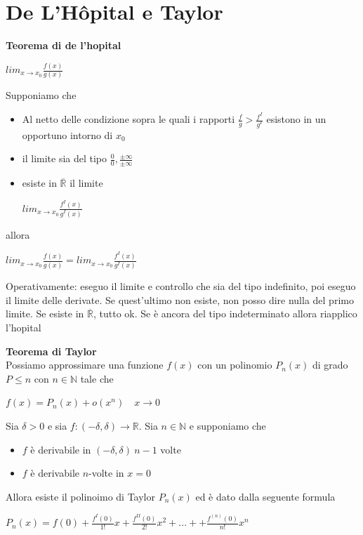 \documentclass[12pt, a4paper]{article}
\begin{document}
    \newpage
    \section{De L'Hôpital e Taylor}
    \textbf{Teorema di de l'hopital}
    \begin{center}
        $lim_{x\to x_{0}}\frac{f(x)}{g(x)}$
    \end{center}
    Supponiamo che
    \begin{itemize}
        \item Al netto delle condizione sopra le quali i rapporti $\frac{f}{g}>\frac{f^{I}}{g^{I}}$ esistono in un
              opportuno intorno di $x_{0}$
        \item il limite sia del tipo $\frac{0}{0},\frac{\pm\infty}{\pm\infty}$
        \item esiste in $\overline{\mathbb{R}}$ il limite
              \begin{center}
                  $lim_{x\to x_{0}}\frac{f^{I}(x)}{g^{I}(x)}$
              \end{center}
    \end{itemize}
    allora
    \begin{center}
        $lim_{x\to x_{0}}\frac{f(x)}{g(x)}=lim_{x\to x_{0}}\frac{f^{I}(x)}{g^{I}(x)}$
    \end{center}

    Operativamente: eseguo il limite e controllo che sia del tipo indefinito, poi eseguo il limite delle derivate. Se
    quest'ultimo non esiste, non posso dire nulla del primo limite. Se esiste in $\overline{\mathbb{R}}$, tutto ok.
    Se è ancora del tipo indeterminato allora riapplico l'hopital

    \textbf{Teorema di Taylor}\\Possiamo approssimare una funzione $f(x)$ con un polinomio $P_{n}(x)$ di grado $P\leq n$
    con $n\in\mathbb{N}$ tale che
    \begin{center}
        $f(x)=P_{n}(x)+o(x^{n})\quad x\to 0$
    \end{center}

    Sia $\delta>0$ e sia $f:(-\delta,\delta)\to \mathbb{R}$. Sia $n\in\mathbb{N}$ e supponiamo che
    \begin{itemize}
        \item $f$ è derivabile in $(-\delta,\delta)\ n-1$ volte
        \item $f$ è derivabile $n$-volte in $x=0$
    \end{itemize}
    Allora esiste il polinoimo di Taylor $P_{n}(x)$ ed è dato dalla seguente formula
    \begin{center}
        $P_{n}(x)=f(0)+\frac{f^{I}(0)}{1!}x+\frac{f^{II}(0)}{2!}x^{2}+...++\frac{f^{(n)}(0)}{n!}x^{n}$
    \end{center}
\end{document}
